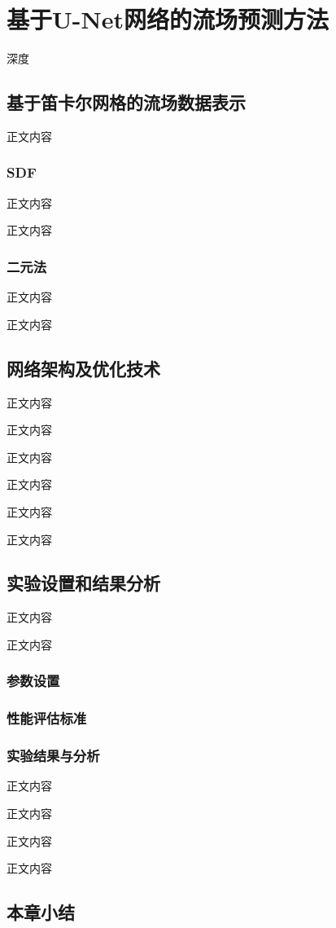 \chapter{基于U-Net网络的流场预测方法}
深度

\section{基于笛卡尔网格的流场数据表示}
正文内容

\subsection{SDF}
正文内容

正文内容



\subsection{二元法}
正文内容

正文内容


\section{网络架构及优化技术}
正文内容

正文内容



正文内容

正文内容

正文内容

正文内容

\section{实验设置和结果分析}
正文内容

正文内容

\subsection{参数设置}



\subsection{性能评估标准}

\subsection{实验结果与分析}
正文内容

正文内容

正文内容

正文内容

\section{本章小结}

